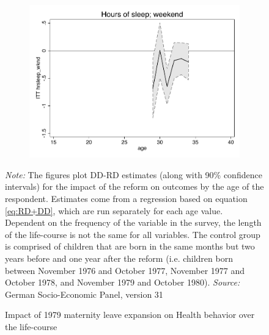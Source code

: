 \documentclass[a4paper ]{article}
\begin{document}
\begin{figure}[p]
\begin{subfigure}[h]{0.48\textwidth}\centering
	\includegraphics[width=\textwidth]{../../analysis/graphs/SOEP/hrsleep_wknd_LC.pdf}
\end{subfigure}


\caption{Impact of 1979 maternity leave expansion on Health behavior over the life-course}\label{fig: LC_HB}
\begin{minipage}{\textwidth} %
{\footnotesize \textit{Note:} The figures plot DD-RD estimates (along with 90\% confidence intervals) for the impact of the reform on outcomes by the age of the respondent. Estimates come from a regression based on equation \ref{eq:RD+DD}, which are run separately for each age value. Dependent on the frequency of the variable in the survey, the length of the life-course is not the same for all variables. The control group is comprised of children that are born in the same months but two years before and one year after the reform (i.e. children born between November 1976 and October 1977, November 1977 and October 1978, and November 1979 and October 1980). \newline \textit{Source: }German Socio-Economic Panel, version 31\par}
\end{minipage}
\end{figure}





    
    
    
    
    
    
    
    
\end{document}
